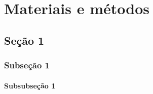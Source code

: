 \chapter{Materiais e métodos}

\section{Seção 1}

\subsection{Subseção 1}

\subsubsection{Subsubseção 1}
